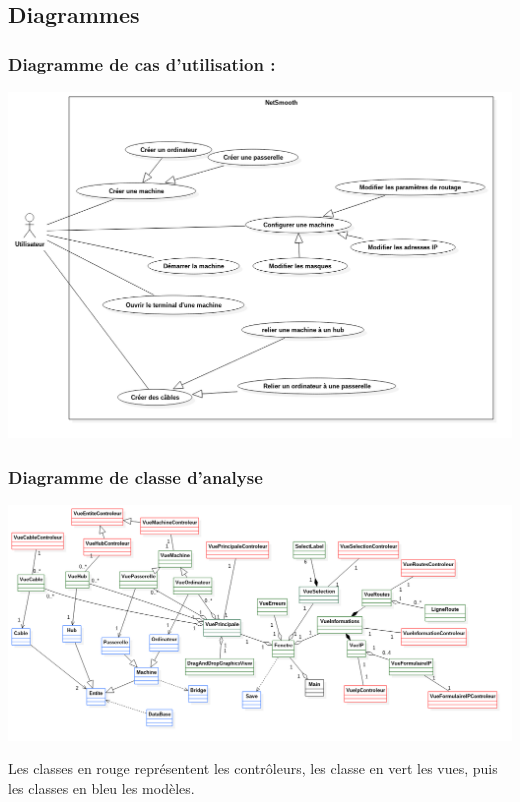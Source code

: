 \subsection{Diagrammes}

\subsubsection{Diagramme de cas d'utilisation :}

\begin{center}
\includegraphics[scale=0.47]{usecase_diagram.png}
\end{center}

\newpage
\subsubsection{Diagramme de classe d'analyse}
\begin{center}
\includegraphics[scale=0.5]{diagramme_analyse.png}
\end{center}

Les classes en rouge représentent les contrôleurs, les classe en vert les vues, puis les classes en bleu les modèles.

